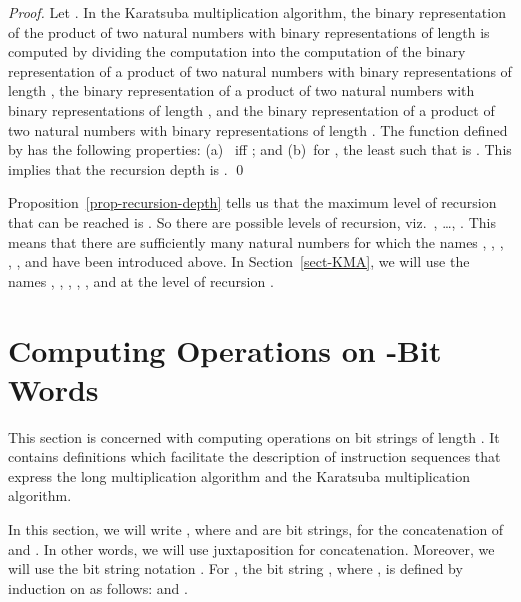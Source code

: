 \documentclass{llncs}
\begin{document}
\begin{proof}
Let .
In the Karatsuba multiplication algorithm, the binary representation of 
the product of two natural numbers with binary representations of length 
 is computed by dividing the computation into the computation of the 
binary representation of a product of two natural numbers with binary 
representations of length , the binary representation of a 
product of two natural numbers with binary representations of length 
, and the binary representation of a product of two natural 
numbers with binary representations of length .
The function  defined by  has the following
properties: (a)~ iff ; and (b)~for , the least 
 such that  is .
This implies that the recursion depth is .
\qed
\end{proof}
Proposition~\ref{prop-recursion-depth} tells us that the maximum level 
of recursion that can be reached is .
So there are  possible levels of recursion, 
\linebreak[2] viz.\ , \ldots, .
This means that there are sufficiently many natural numbers  for 
which the names , , , , , and  
have been introduced above.
In Section~\ref{sect-KMA}, we will use the names , , 
, , , and  at the level of recursion 
.

\section{Computing Operations on -Bit Words}
\label{sect-opns-words}

This section is concerned with computing operations on bit strings of 
length .
It contains definitions which facilitate the description of instruction 
sequences that express the long multiplication algorithm and the 
Karatsuba multiplication algorithm.

In this section, we will write , where  and 
 are bit strings, for the concatenation of  and .
In other words, we will use juxtaposition for concatenation.
Moreover, we will use the bit string notation .
For , the bit string , where , is defined 
by induction on  as follows:  and .
\end{document}
